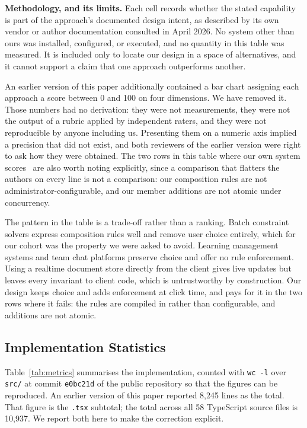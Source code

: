 \documentclass[11pt,a4paper]{article}
\theoremstyle{plain}
\theoremstyle{definition}
\theoremstyle{remark}
\begin{document}
\noindent\textbf{Methodology, and its limits.} Each cell records whether the stated capability is part of the approach's documented design intent, as described by its own vendor or author documentation consulted in April 2026. No system other than ours was installed, configured, or executed, and no quantity in this table was measured. It is included only to locate our design in a space of alternatives, and it cannot support a claim that one approach outperforms another.

An earlier version of this paper additionally contained a bar chart assigning each approach a score between 0 and 100 on four dimensions. We have removed it. Those numbers had no derivation: they were not measurements, they were not the output of a rubric applied by independent raters, and they were not reproducible by anyone including us. Presenting them on a numeric axis implied a precision that did not exist, and both reviewers of the earlier version were right to ask how they were obtained. The two rows in this table where our own system scores \ are also worth noting explicitly, since a comparison that flatters the authors on every line is not a comparison: our composition rules are not administrator-configurable, and our member additions are not atomic under concurrency.

The pattern in the table is a trade-off rather than a ranking. Batch constraint solvers express composition rules well and remove user choice entirely, which for our cohort was the property we were asked to avoid. Learning management systems and team chat platforms preserve choice and offer no rule enforcement. Using a realtime document store directly from the client gives live updates but leaves every invariant to client code, which is untrustworthy by construction. Our design keeps choice and adds enforcement at click time, and pays for it in the two rows where it fails: the rules are compiled in rather than configurable, and additions are not atomic.



\subsection{Implementation Statistics}

Table~\ref{tab:metrics} summarises the implementation, counted with \texttt{wc -l} over \texttt{src/} at commit \texttt{e0bc21d} of the public repository so that the figures can be reproduced. An earlier version of this paper reported 8,245 lines as the total. That figure is the \texttt{.tsx} subtotal; the total across all 58 TypeScript source files is 10,937. We report both here to make the correction explicit.
\end{document}
